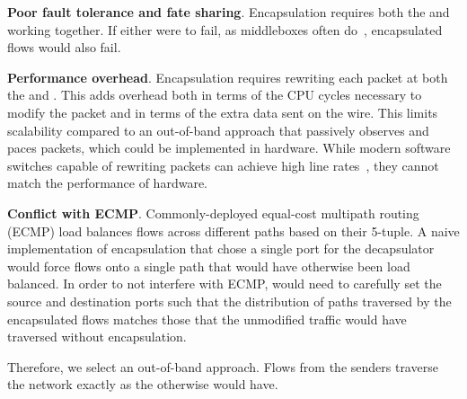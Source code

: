 \textbf{Poor fault tolerance and fate sharing}. Encapsulation requires both the \inbox and \outbox working together. If either were to fail,
as middleboxes often do~\cite{aplomb}, encapsulated flows would also fail. 

\textbf{Performance overhead}. Encapsulation requires rewriting each packet at both the \inbox and \outbox. This adds overhead both in terms of the CPU cycles necessary to modify the packet and in terms of the extra data sent on the wire. This limits scalability compared to an out-of-band approach that passively observes and paces packets, which could be implemented in hardware. While modern software switches capable of rewriting packets can achieve high line rates~\cite{netbricks, bess}, they cannot match the performance of hardware.  

\textbf{Conflict with ECMP}. Commonly-deployed equal-cost multipath routing (ECMP) load balances flows across different paths based on their 5-tuple. A naive implementation of encapsulation that chose a single port for the decapsulator would force flows onto a single path that would have otherwise been load balanced. In order to not interfere with ECMP, \name would need to carefully set the source and destination ports such that the distribution of paths traversed by the encapsulated flows matches those that the unmodified traffic would have traversed without encapsulation. 

Therefore, we select an out-of-band approach. Flows from the senders traverse the network exactly as the otherwise would have.